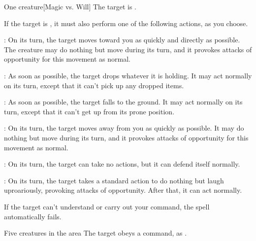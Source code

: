 \begin{spellheader}
    \spellrng{\rngmed}
\end{spellheader}
\begin{spelleffects}
    \begin{spelltarget}{One creature}[Magic vs. Will]
        \spellsuccess The target is \bewildered.

        If the target is \bloodied, it must also perform one of the following actions, as you choose.
        \par {}: On its turn, the target moves toward you as quickly and directly as possible. The creature may do nothing but move during its turn, and it provokes attacks of opportunity for this movement as normal.
        \par {}: As soon as possible, the target drops whatever it is holding. It may act normally on its turn, except that it can't pick up any dropped items.
        \par {}: As soon as possible, the target falls to the ground. It may act normally on its turn, except that it can't get up from its prone position.
        \par {}: On its turn, the target moves away from you as quickly as possible. It may do nothing but move during its turn, and it provokes attacks of opportunity for this movement as normal.
        \par {}: On its turn, the target can take no actions, but it can defend itself normally.
        \par {}: On its turn, the target takes a standard action to do nothing but laugh uproariously, provoking attacks of opportunity. After that, it can act normally.
    \end{spelltarget}
\end{spelleffects}
\begin{spellfooter}
    \spellnotes If the target can't understand or carry out your command, the spell automatically fails.
\end{spellfooter}

\begin{spellheader}
    \spellrng{\rngmed}
\end{spellheader}
\begin{spelleffects}
    \begin{spelltarget}{Five creatures in the area}
        \spellsuccess The target obeys a command, as .
    \end{spelltarget}
\end{spelleffects}

